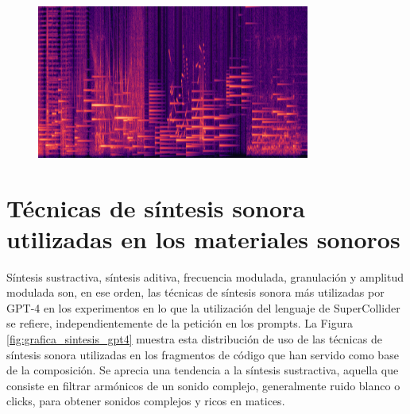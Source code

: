 \begin{figure}
    \centering
    \includegraphics[width=0.8\textwidth]{./figuras/sonograma_02.png}
    \source{\propio}
    \label{fig:sonograma_algorai}
\end{figure}

\section{Técnicas de síntesis sonora utilizadas en los materiales sonoros}

Síntesis sustractiva, síntesis aditiva, frecuencia modulada, granulación y amplitud modulada son, en ese orden, las técnicas de síntesis sonora más utilizadas por GPT-4 en los experimentos en lo que la utilización del lenguaje de SuperCollider se refiere, independientemente de la petición en los prompts. La Figura \ref{fig:grafica_sintesis_gpt4} muestra esta distribución de uso de las técnicas de síntesis sonora utilizadas en los fragmentos de código que han servido como base de la composición. Se aprecia una tendencia a la síntesis sustractiva, aquella que consiste en filtrar armónicos de un sonido complejo, generalmente ruido blanco o clicks, para obtener sonidos complejos y ricos en matices.

